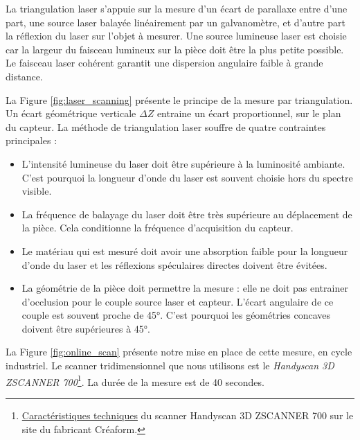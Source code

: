 La triangulation laser s'appuie sur la mesure d'un écart de parallaxe entre d'une part, une source laser balayée linéairement par un galvanomètre, et d'autre part la réflexion du laser sur l'objet à mesurer.  %
Une source lumineuse laser est choisie car la largeur du faisceau lumineux sur la pièce doit être la plus petite possible.
Le faisceau laser cohérent garantit une dispersion angulaire faible à grande distance.

La Figure \ref{fig:laser_scanning} présente le principe de la mesure par triangulation.
Un écart géométrique verticale $\Delta Z$ entraine un écart proportionnel, sur le plan du capteur.
La méthode de triangulation laser souffre de quatre contraintes principales :
\begin{itemize}
	\item L'intensité lumineuse du laser doit être supérieure à la luminosité ambiante. C'est pourquoi la longueur d'onde du laser est souvent choisie hors du spectre visible.
	\item La fréquence de balayage du laser doit être très supérieure au déplacement de la pièce. Cela conditionne la fréquence d'acquisition du capteur.
	\item Le matériau qui est mesuré doit avoir une absorption faible pour la longueur d'onde du laser et les réflexions spéculaires directes doivent être évitées.
	\item La géométrie de la pièce doit permettre la mesure : elle ne doit pas entrainer d'occlusion pour le couple source laser et capteur. L'écart angulaire de ce couple est souvent proche de 45°. C'est pourquoi les géométries concaves doivent être supérieures à 45°.
\end{itemize}

La Figure \ref{fig:online_scan} présente notre mise en place de cette mesure, en cycle industriel.
Le scanner tridimensionnel que nous utilisons est le \textit{Handyscan 3D ZSCANNER 700}\footnote{\href{https://www.creaform3d.com/fr/soutien-la-clientele/produits-retires/handyscan-3d-de-1re-generation-zscanner-700}{Caractéristiques techniques} du scanner Handyscan 3D ZSCANNER 700 sur le site du fabricant Créaform.}.
La durée de la mesure est de 40 secondes.

